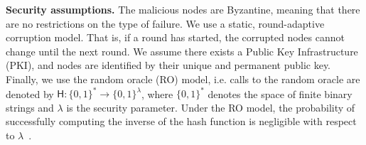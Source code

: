 \textbf{Security assumptions.\quad}
The malicious nodes are Byzantine,
meaning that there are no restrictions on the type of failure.
We use a static, round-adaptive corruption model.
That is, if a round has started, the corrupted nodes cannot change until the next round.
We assume there exists a Public Key Infrastructure (PKI), and nodes are identified by their unique and permanent public key.
Finally, we use the random oracle (RO) model, i.e. calls to the random oracle are denoted by $\textsf{H}: \{0, 1\}^* \rightarrow \{0, 1\}^\lambda$,
where $\{0, 1\}^*$ denotes the space of finite binary strings and $\lambda$ is the security parameter.
Under the RO model, the probability of successfully computing the inverse of the hash function is negligible with respect to $\lambda$~\cite{bellare1993random}.

